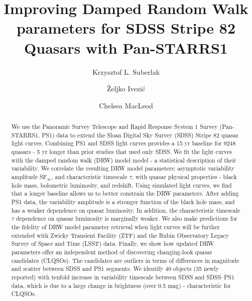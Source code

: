 \documentclass[twocolumn]{aastex62}
\begin{document}
\title{Improving Damped Random Walk parameters for SDSS Stripe 82 Quasars with Pan-STARRS1}


\author[0000-0002-9589-1306]{Krzysztof L. Suberlak}


\author[0000-0001-5250-2633]{\v{Z}eljko Ivezi\'c}


\author[0000-0003-3422-2202]{Chelsea MacLeod}


\begin{abstract}

We use the Panoramic Survey Telescope and Rapid Response System 1 Survey (Pan-STARRS1, PS1) data to extend  the Sloan Digital Sky Survey (SDSS) Stripe 82 quasar light curves. Combining PS1 and SDSS light curves provides a 15 yr baseline for 9248 quasars - 5 yr longer than prior studies that used only SDSS. We fit the light curves with the damped random walk (DRW) model model - a statistical description of their variability. We correlate the resulting DRW model parameters: asymptotic variability amplitude SF$_{\infty}$, and characteristic timescale $\tau$, with quasar physical properties - black hole mass, bolometric luminosity, and redshift. Using simulated light curves, we find that a longer baseline allows us to better constrain the DRW parameters. After adding PS1 data, the variability amplitude is a stronger function of the black hole mass, and has a weaker dependence on quasar luminosity. In addition, the characteristic timescale $\tau$ dependence on quasar luminosity is marginally weaker. We also make predictions for the fidelity of DRW model parameter retrieval when light curves will be further extended with Zwicky Transient Facility (ZTF) and the Rubin Observatory Legacy Survey of Space and Time (LSST) data. Finally, we show how updated DRW parameters offer an independent method of discovering changing-look quasar candidates (CLQSOs). The candidates are outliers in terms of differences in magnitude and scatter between SDSS and PS1 segments. We identify 40 objects (35 newly reported) with tenfold increase in variability timescale between SDSS and SDSS--PS1 data, which is due to a large change in brightness (over 0.5 mag) - characteristic for CLQSOs. 


\end{abstract}
\end{document}

